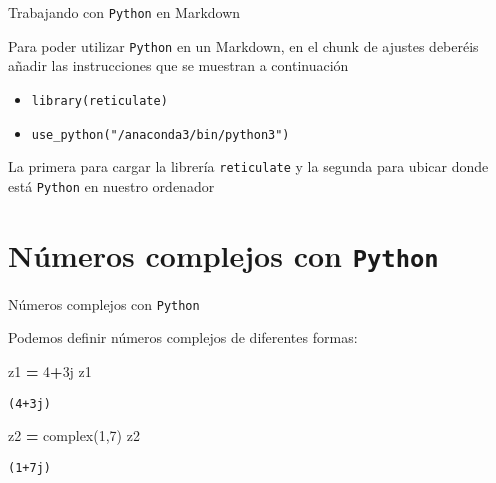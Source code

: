 \documentclass[
  ignorenonframetext,
]{beamer}
\newenvironment{Shaded}{\begin{snugshade}}{\end{snugshade}}
\newcommand{\BuiltInTok}[1]{#1}
\newcommand{\DecValTok}[1]{\textcolor[rgb]{0.00,0.00,0.81}{#1}}
\newcommand{\NormalTok}[1]{#1}
\newcommand{\OperatorTok}[1]{\textcolor[rgb]{0.81,0.36,0.00}{\textbf{#1}}}
\providecommand{\tightlist}{%
  \setlength{\itemsep}{0pt}\setlength{\parskip}{0pt}}
\begin{document}
\begin{frame}[fragile]{Trabajando con \texttt{Python} en Markdown}
\protect\hypertarget{trabajando-con-python-en-markdown-2}{}

Para poder utilizar \texttt{Python} en un Markdown, en el chunk de
ajustes deberéis añadir las instrucciones que se muestran a continuación

\begin{itemize}
\tightlist
\item
  \texttt{library(reticulate)}
\item
  \texttt{use\_python("/anaconda3/bin/python3")}
\end{itemize}

La primera para cargar la librería \texttt{reticulate} y la segunda para
ubicar donde está \texttt{Python} en nuestro ordenador

\end{frame}

\hypertarget{nuxfameros-complejos-con-python}{%
\section{\texorpdfstring{Números complejos con
\texttt{Python}}{Números complejos con Python}}\label{nuxfameros-complejos-con-python}}

\begin{frame}[fragile]{Números complejos con \texttt{Python}}
\protect\hypertarget{nuxfameros-complejos-con-python-1}{}

Podemos definir números complejos de diferentes formas:

\begin{Shaded}
\begin{Highlighting}[]
\NormalTok{z1 }\OperatorTok{=} \DecValTok{4}\OperatorTok{+}\NormalTok{3j}
\NormalTok{z1}
\end{Highlighting}
\end{Shaded}

\begin{verbatim}
(4+3j)
\end{verbatim}

\begin{Shaded}
\begin{Highlighting}[]
\NormalTok{z2 }\OperatorTok{=} \BuiltInTok{complex}\NormalTok{(}\DecValTok{1}\NormalTok{,}\DecValTok{7}\NormalTok{)}
\NormalTok{z2}
\end{Highlighting}
\end{Shaded}

\begin{verbatim}
(1+7j)
\end{verbatim}

\end{frame}
\end{document}
